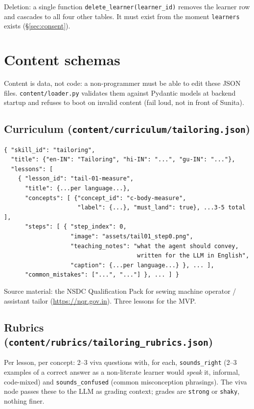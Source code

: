 \documentclass[11pt]{article}
\newcommand{\code}[1]{\texttt{#1}}
\begin{document}
Deletion: a single function \code{delete\_learner(learner\_id)} removes the learner row and cascades to all four other tables. It must exist from the moment \code{learners} exists (\S\ref{sec:consent}).

\section{Content schemas}
\label{sec:content}

Content is data, not code: a non-programmer must be able to edit these JSON files. \code{content/loader.py} validates them against Pydantic models at backend startup and refuses to boot on invalid content (fail loud, not in front of Sunita).

\subsection{Curriculum (\code{content/curriculum/tailoring.json})}

\begin{verbatim}
{ "skill_id": "tailoring",
  "title": {"en-IN": "Tailoring", "hi-IN": "...", "gu-IN": "..."},
  "lessons": [
    { "lesson_id": "tail-01-measure",
      "title": {...per language...},
      "concepts": [ {"concept_id": "c-body-measure",
                     "label": {...}, "must_land": true}, ...3-5 total ],
      "steps": [ { "step_index": 0,
                   "image": "assets/tail01_step0.png",
                   "teaching_notes": "what the agent should convey,
                                      written for the LLM in English",
                   "caption": {...per language...} }, ... ],
      "common_mistakes": ["...", "..."] }, ... ] }
\end{verbatim}

Source material: the NSDC Qualification Pack for sewing machine operator / assistant tailor (\url{https://nqr.gov.in}). Three lessons for the MVP.

\subsection{Rubrics (\code{content/rubrics/tailoring\_rubrics.json})}

Per lesson, per concept: 2--3 viva questions with, for each, \code{sounds\_right} (2--3 examples of a correct answer as a non-literate learner would \emph{speak} it, informal, code-mixed) and \code{sounds\_confused} (common misconception phrasings). The viva node passes these to the LLM as grading context; grades are \code{strong} or \code{shaky}, nothing finer.
\end{document}
